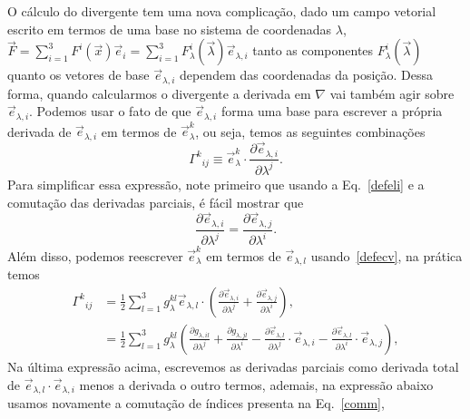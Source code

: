 O cálculo do divergente tem uma nova complicação, dado um campo vetorial escrito
em termos de uma base no sistema de coordenadas $\lambda$, $ \vec{F} = \sum_{i=1}^3F^i(\vec{x})\vec{e}_{i} =
	\sum_{i=1}^3F_\lambda^i(\vec{\lambda})\vec{e}_{\lambda,i}$ tanto as componentes
$F_\lambda^i(\vec{\lambda})$ quanto os vetores de base $\vec{e}_{\lambda,i}$
dependem das coordenadas da posição. Dessa forma, quando calcularmos o
divergente a derivada em $\nabla$ vai também agir sobre $\vec{e}_{\lambda,i}$.
Podemos usar o fato de que $\vec{e}_{\lambda,i}$ forma uma base para escrever a
própria derivada de $\vec{e}_{\lambda,i}$ em termos de $\vec{e}_{\lambda}^k$, ou
seja, temos as seguintes combinações
\begin{equation}\label{scdef}
	\Gamma^{k}{}_{ij} \equiv \vec{e}^k_{\lambda}\cdot\frac{\partial \vec{e}_{\lambda,i}}{\partial\lambda^j}.
\end{equation}
Para simplificar essa expressão, note primeiro que usando a Eq.~\eqref{defeli} e
a comutação das derivadas parciais, é fácil mostrar que
\begin{equation}\label{comm}
	\frac{\partial \vec{e}_{\lambda,i}}{\partial\lambda^j} = \frac{\partial \vec{e}_{\lambda,j}}{\partial\lambda^i}.
\end{equation}
Além disso, podemos reescrever $\vec{e}^k_{\lambda}$ em termos de
$\vec{e}_{\lambda,l}$ usando~\eqref{defecv}, na prática temos
\begin{equation}
	\begin{split}
		\Gamma^{k}{}_{ij} & = \frac{1}{2}\sum_{l=1}^3g_\lambda^{kl}\vec{e}_{\lambda,l}\cdot\left(\frac{\partial \vec{e}_{\lambda,i}}{\partial\lambda^j}+\frac{\partial \vec{e}_{\lambda,j}}{\partial\lambda^i}\right),                                                                                                                           \\
		                  & =\frac{1}{2} \sum_{l=1}^3g_\lambda^{kl}\left(\frac{\partial g_{\lambda,il}}{\partial\lambda^j}+\frac{\partial g_{\lambda,jl}}{\partial\lambda^i}-\frac{\partial\vec{e}_{\lambda,l}}{\partial\lambda^j}\cdot\vec{e}_{\lambda,i}-\frac{\partial\vec{e}_{\lambda,l}}{\partial\lambda^i}\cdot\vec{e}_{\lambda,j}\right),
	\end{split}
\end{equation}
Na última expressão acima, escrevemos as derivadas parciais como derivada total
de $\vec{e}_{\lambda,l}\cdot\vec{e}_{\lambda,i}$ menos a derivada o outro
termos, ademais, na expressão abaixo usamos novamente a comutação de índices presenta na Eq.~\eqref{comm},
